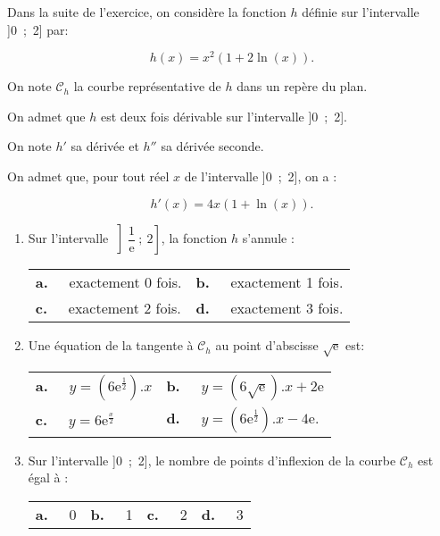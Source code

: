 \documentclass[11pt,a4paper,french]{article}
\begin{document}
Dans la suite de l'exercice, on considère la fonction $h$ définie sur l'intervalle ]0~;~2] par:

\[h(x) = x^2(1 + 2\ln (x)).\]

On note $\mathcal{C}_h$ la courbe représentative de $h$ dans un repère du plan. 

On admet que $h$ est deux fois dérivable sur l'intervalle ]0~;~2].

On note $h'$ sa dérivée et $h''$ sa dérivée seconde.

On admet que, pour tout réel $x$ de l'intervalle ]0~;~2], on a : 

\[h'(x) = 4x(1 + \ln (x)).\]

\begin{enumerate}[resume]
\item Sur l'intervalle $\left]\dfrac{1}{\text{e}}~;~2\right]$, la fonction $h$ s'annule :

\begin{center}
\begin{tabularx}{\linewidth}{*{2}{X}}
\textbf{a.~~} exactement 0 fois. &\textbf{b.~~}  exactement 1 fois.\\
 \textbf{c.~~} exactement 2 fois. &\textbf{d.~~}  exactement 3 fois.
\end{tabularx}
\end{center}

\item Une équation de la tangente à $\mathcal{C}_h$ au point d'abscisse $\sqrt{\text{e}}$ est:

\begin{center}
\begin{tabularx}{\linewidth}{*{2}{X}}
\textbf{a.~~} $y = \left(6\text{e}^{\frac12}\right) .{} x $&
\textbf{b.~~} $y = \left(6\sqrt{\text{e}}\right).{} x + 2\text{e}$\\
\textbf{c.~~} $y = 6\text{e}^{\frac{x}{2}}$&\textbf{d.~~} $y = \left(6\text{e}^{\frac12}\right) .{} x - 4\text{e}$.
\end{tabularx}
\end{center}

\item Sur l'intervalle ]0~;~2], le nombre de points d'inflexion de la courbe $\mathcal{C}_h$ est égal à :

\begin{center}
\begin{tabularx}{\linewidth}{*{4}{X}}
\textbf{a.~~} 0&\textbf{b.~~} 1 &\textbf{c.~~}  2 &\textbf{d.~~}  3
\end{tabularx}
\end{center}


\end{enumerate}
\end{document}
